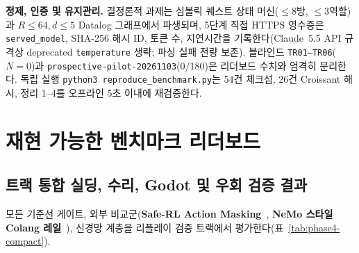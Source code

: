 \textbf{정제, 인증 및 유지관리.} 결정론적 과제는 심볼릭 퀘스트 상태 머신($\le$8방, $\le$3역할)과 $R{\le}64, d{\le}5$ Datalog 그래프에서 파생되며, 5단계 직접 HTTPS 영수증은 \texttt{served\_model}, SHA-256 해시 ID, 토큰 수, 지연시간을 기록한다(Claude~5.5 API 규격상 deprecated \texttt{temperature} 생략; 파싱 실패 전량 보존). 블라인드 \texttt{TR01--TR06}($N{=}0$)과 \texttt{prospective-pilot-20261103}(0/180)은 리더보드 수치와 엄격히 분리한다. 독립 실행 \texttt{python3 reproduce\_benchmark.py}는 54건 체크섬, 26건 Croissant 해시, 정리 1--4를 오프라인 5초 이내에 재검증한다.

\section{재현 가능한 벤치마크 리더보드}\label{sec:eval}
\subsection{트랙 통합 실딩, 수리, Godot 및 우회 검증 결과}\label{sec:phase4-compact}
모든 기준선 게이트, 외부 비교군(\textbf{Safe-RL Action Masking}~\cite{alshiekh2018shield}, \textbf{NeMo 스타일 Colang 레일}~\cite{rebedea2023nemo}), 신경망 계층을 리플레이 검증 트랙에서 평가한다(표~\ref{tab:phase4-compact}).

